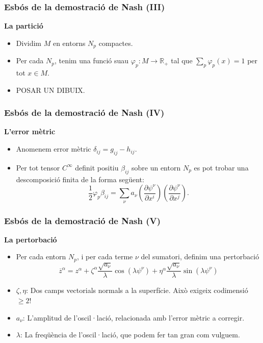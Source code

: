 \documentclass[10pt]{beamer}
\begin{document}
\begin{frame}
    \frametitle{Esbós de la demostració de Nash (III)}
    
    \textbf{La partició}
    \begin{itemize}
        \item Dividim $M$ en entorns $N_p$ compactes.
        \item Per cada $N_p$, tenim una funció suau $\varphi_p: M \to \mathbb{R}_+$ tal que $\sum_p \varphi_p(x)=1$ per tot $x\in M$.
        \item POSAR UN DIBUIX.
    \end{itemize}
\end{frame}

\begin{frame}
    \frametitle{Esbós de la demostració de Nash (IV)}
    
    \textbf{L'error mètric}
    \begin{itemize}
        \item Anomenem error mètric $\delta_{ij} = g_{ij} - h_{ij}$.
        \item Per tot tensor $C^\infty$ definit positiu $\beta_{ij}$ sobre un entorn $N_p$ es pot trobar una descomposició finita de la forma següent:
        \begin{equation*}
            \frac12\varphi_p\beta_{ij} = \sum_\nu a_\nu \left(\frac{\partial\psi^\nu}{\partial x^i}\right)\left(\frac{\partial\psi^\nu}{\partial x^j}\right).
        \end{equation*}
    \end{itemize}
\end{frame}

\begin{frame}
    \frametitle{Esbós de la demostració de Nash (V)}
    
    \textbf{La pertorbació}
    \begin{itemize}
        \item Per cada entorn $N_p$, i per cada terme $\nu$ del sumatori, definim una pertorbació 
        \begin{equation*}
            \boxed{
            \overline{z}^\alpha = z^\alpha + \zeta^\alpha\frac{\sqrt{a_\nu}}{\lambda}\cos(\lambda \psi^\nu) + \eta^\alpha\frac{\sqrt{a_\nu}}{\lambda}\sin(\lambda \psi^\nu)}
        \end{equation*}
    \end{itemize}
    \begin{itemize}
        \item $\zeta, \eta$: Dos camps vectorials normals a la superfície. \alert{Això exigeix codimensió $\ge 2$!}
        \item $a_\nu$: L'amplitud de l'oscil·lació, relacionada amb l'error mètric a corregir.
        \item $\lambda$: La freqüència de l'oscil·lació, que podem fer tan gran com vulguem.
    \end{itemize}
\end{frame}
\end{document}
